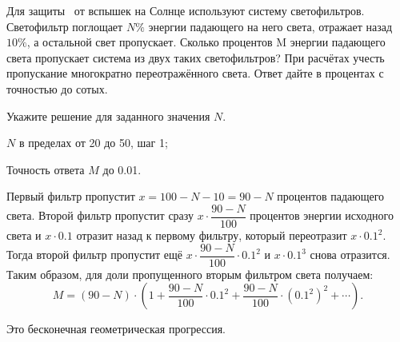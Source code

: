 
Для защиты  от
вспышек на Солнце используют систему светофильтров. Светофильтр поглощает $N \%$ энергии падающего на 
него света, отражает назад $10 \%$, а остальной
свет пропускает. Сколько процентов M энергии
падающего света пропускает система из двух таких светофильтров? При расчётах
учесть пропускание многократно переотражённого света. Ответ дайте в процентах с точностью до сотых.

Укажите решение для заданного значения $N$.

\paramSection

$N$ в пределах от 20 до 50, шаг 1;         

Точность ответа $M$ до  0.01.

\solutionSection

Первый фильтр пропустит $x = 100 - N - 10 = 90 - N$ процентов падающего света. Второй фильтр пропустит сразу  
$x \cdot \dfrac{90-N}{100}$ процентов энергии исходного света и  $x \cdot 0.1$ отразит назад к первому фильтру, 
который переотразит  $x \cdot 0.1^2$. Тогда второй фильтр пропустит ещё $x \cdot \dfrac{90-N}{100} \cdot 0.1^2$ и 
$x \cdot 0.1^3$ снова отразится. Таким образом, для доли пропущенного вторым фильтром света получаем:
$$M=(90-N) \cdot (1+\dfrac{90-N}{100} \cdot 0.1^2+\dfrac{90-N}{100} \cdot (0.1^2 )^2+ \cdots) .$$

Это бесконечная геометрическая прогрессия.

